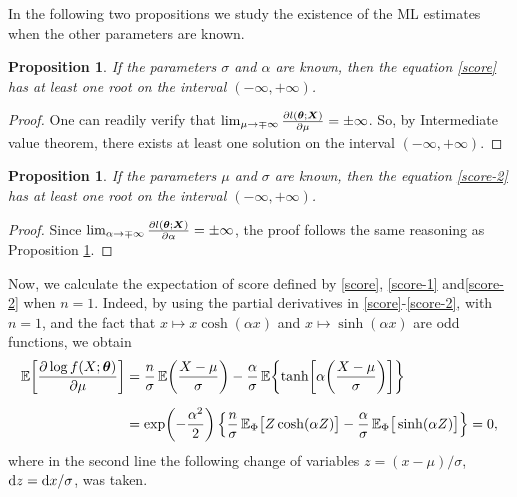 \documentclass[12pt]{article}
\newtheorem{proposition}[theorem]{Proposition}
\theoremstyle{definition}
\begin{document}
In the following two propositions we study the existence 
of the ML estimates when the other parameters are known.
\begin{proposition}\label{prop-existence-roots}
If the parameters $\sigma$ and $\alpha$ are known, then the equation \eqref{score} has at least one root on the interval $(-\infty, +\infty)$.
\end{proposition}
\begin{proof}
One can readily verify that $\lim_{\mu\to\mp\infty} {\partial l(\boldsymbol{\theta};\boldsymbol{X})\over \partial\mu} =\pm\infty$. So, by Intermediate value theorem, there exists at least one solution on the interval $(-\infty, +\infty)$.
\end{proof}

\begin{proposition}
If the parameters $\mu$ and $\sigma$ are known, then the equation \eqref{score-2} has at least one root on the interval $(-\infty, +\infty)$.
\end{proposition}
\begin{proof}
Since $\lim_{\alpha\to\mp \infty} {\partial l(\boldsymbol{\theta};\boldsymbol{X})\over \partial\alpha} =\pm\infty$, the proof follows the same reasoning as Proposition \ref{prop-existence-roots}.
\end{proof}


Now, we calculate the expectation of score defined by \eqref{score}, \eqref{score-1} and\eqref{score-2} when $n=1$. Indeed,
by using the partial derivatives in \eqref{score}-\eqref{score-2}, with $n=1$, and the fact that $x\longmapsto x\cosh(\alpha x)$ and $x\longmapsto\sinh(\alpha x)$ are odd functions, we obtain
\begin{align*}
\mathbb{E}\biggl[{\partial \log f(X;\boldsymbol{\theta})\over \partial \mu }\biggr]
&=
{n\over \sigma}\, 
\mathbb{E}\biggl({X-\mu\over\sigma}\biggr)
-
{\alpha\over\sigma}\, 
\mathbb{E}\biggl\{{\rm tanh}\biggl[\alpha\biggl({ X-\mu\over \sigma}\biggr)\biggr]\biggr\}
\\[0,2cm]
&=
\exp\biggl(-{\alpha^2\over 2}\biggr)
\left\{
{n\over \sigma}\,
\mathbb{E}_{\Phi}
\big[Z\cosh(\alpha Z)\big]
-
{\alpha\over\sigma}\, 
\mathbb{E}_{\Phi}
\big[\sinh(\alpha Z)\big]
\right\}
=0,
\end{align*}
where in the second line the following change of variables $z=(x-\mu)/\sigma$, ${\rm d}z={\rm d}x/\sigma$, was taken.
\end{document}

